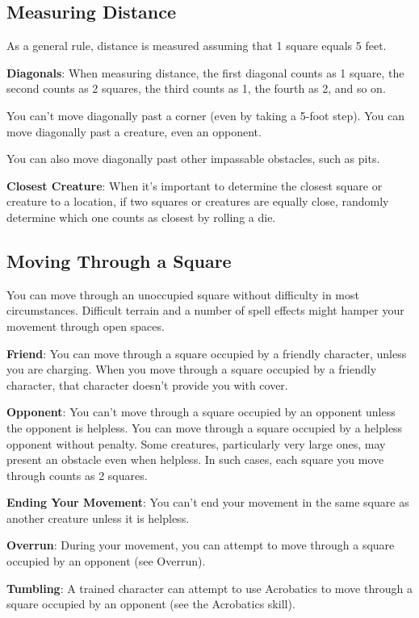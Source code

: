 \subsection{Measuring Distance}

				
As a general rule, distance is measured assuming that 1 square equals 5 feet.
				
\textbf{Diagonals}: When measuring distance, the first diagonal counts as 1 square, the second counts as 2 squares, the third counts as 1, the fourth as 2, and so on.
				
You can't move diagonally past a corner (even by taking a 5-foot step). You can move diagonally past a creature, even an opponent.
				
You can also move diagonally past other impassable obstacles, such as pits.
				
\textbf{Closest Creature}: When it's important to determine the closest square or creature to a location, if two squares or creatures are equally close, randomly determine which one counts as closest by rolling a die.
				
\subsection{Moving Through a Square}

				
You can move through an unoccupied square without difficulty in most circumstances. Difficult terrain and a number of spell effects might hamper your movement through open spaces.
				
\textbf{Friend}: You can move through a square occupied by a friendly character, unless you are charging. When you move through a square occupied by a friendly character, that character doesn't provide you with cover.
				
\textbf{Opponent}: You can't move through a square occupied by an opponent unless the opponent is helpless. You can move through a square occupied by a helpless opponent without penalty. Some creatures, particularly very large ones, may present an obstacle even when helpless. In such cases, each square you move through counts as 2 squares.
				
\textbf{Ending Your Movement}: You can't end your movement in the same square as another creature unless it is helpless.
				
\textbf{Overrun}: During your movement, you can attempt to move through a square occupied by an opponent (see Overrun).
				
\textbf{Tumbling}: A trained character can attempt to use Acrobatics to move through a square occupied by an opponent (see the Acrobatics skill).
				
